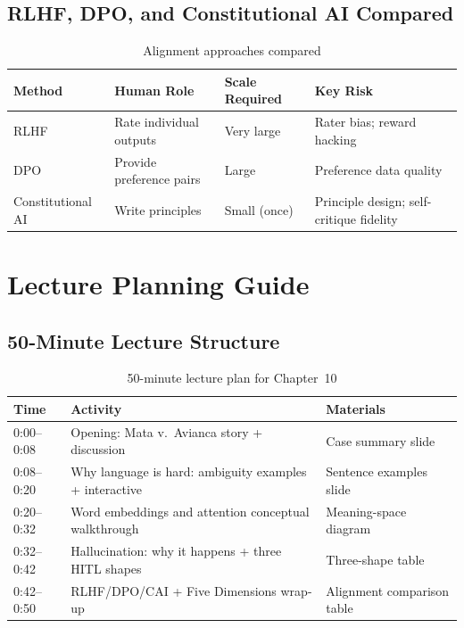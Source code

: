 \subsection{RLHF, DPO, and Constitutional AI Compared}

\begin{table}[htbp]
\caption{Alignment approaches compared}
\label{tab:alignment-comparison}
\centering
\begin{tabular}{@{}p{3cm}p{3.5cm}p{2.5cm}p{2.5cm}@{}}
\toprule
\textbf{Method} & \textbf{Human Role} & \textbf{Scale Required} & \textbf{Key Risk} \\
\midrule
RLHF & Rate individual outputs & Very large & Rater bias; reward hacking \\
DPO & Provide preference pairs & Large & Preference data quality \\
Constitutional AI & Write principles & Small (once) & Principle design; self-critique fidelity \\
\bottomrule
\end{tabular}
\end{table}

\section{Lecture Planning Guide}

\subsection{50-Minute Lecture Structure}

\begin{table}[htbp]
\caption{50-minute lecture plan for Chapter~10}
\label{tab:lecture-plan-ch10}
\centering
\begin{tabular}{@{}p{2.5cm}p{6cm}p{3.5cm}@{}}
\toprule
\textbf{Time} & \textbf{Activity} & \textbf{Materials} \\
\midrule
0:00--0:08 & Opening: Mata v.\ Avianca story + discussion & Case summary slide \\
0:08--0:20 & Why language is hard: ambiguity examples + interactive & Sentence examples slide \\
0:20--0:32 & Word embeddings and attention conceptual walkthrough & Meaning-space diagram \\
0:32--0:42 & Hallucination: why it happens + three HITL shapes & Three-shape table \\
0:42--0:50 & RLHF/DPO/CAI + Five Dimensions wrap-up & Alignment comparison table \\
\bottomrule
\end{tabular}
\end{table}

